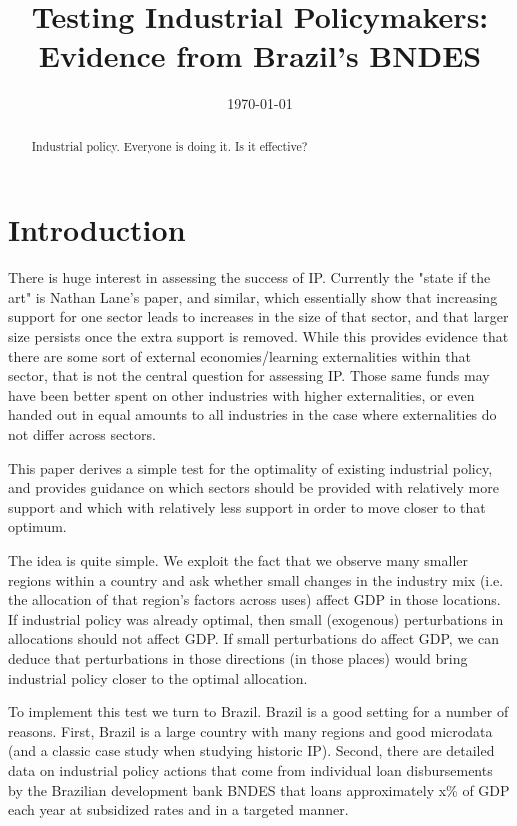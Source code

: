 \documentclass{article}
\begin{document}
\title{Testing Industrial Policymakers: Evidence from Brazil's BNDES}
\author{}
\date{\today}

\maketitle

\begin{abstract}
    Industrial policy. Everyone is doing it. Is it effective?
\end{abstract}

\normalsize

\newpage
\clearpage
\setcounter{page}{1}
\setlength{\parskip}{10pt}
\setlength{\parindent}{10pt}

\section{Introduction}

There is huge interest in assessing the success of IP. Currently the "state if the art" is Nathan Lane's paper, and similar, which essentially show that increasing support for one sector leads to increases in the size of that sector, and that larger size persists once the extra support is removed. While this provides evidence that there are some sort of external economies/learning externalities within that sector, that is not the central question for assessing IP. Those same funds may have been better spent on other industries with higher externalities, or even handed out in equal amounts to all industries in the case where externalities do not differ across sectors.

This paper derives a simple test for the optimality of existing industrial policy, and provides guidance on which sectors should be provided with relatively more support and which with relatively less support in order to move closer to that optimum.

The idea is quite simple. We exploit the fact that we observe many smaller regions within a country and ask whether small changes in the industry mix (i.e. the allocation of that region's factors across uses) affect GDP in those locations. If industrial policy was already optimal, then small (exogenous) perturbations in allocations should not affect GDP. If small perturbations do affect GDP, we can deduce that perturbations in those directions (in those places) would bring industrial policy closer to the optimal allocation.

To implement this test we turn to Brazil. Brazil is a good setting for a number of reasons. First, Brazil is a large country with many regions and good microdata (and a classic case study when studying historic IP). Second, there are detailed data on industrial policy actions that come from individual loan disbursements by the Brazilian development bank BNDES that loans approximately x\% of GDP each year at subsidized rates and in a targeted manner.
\end{document}

